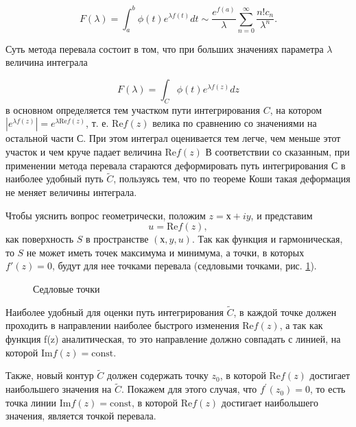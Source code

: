 \documentclass[%
bachelor,    %
natbib,      %
subf,        %
href,        %
colorlinks,  %
]{disser}
\renewcommand{\Re}{\mathrm{Re}}
\renewcommand{\Im}{\mathrm{Im}}
\newcommand{\const}{\mathrm{const}}
\begin{document}
\begin{equation}\label{eq:eq10}
F(\lambda) = \int_{a}^{b}\phi(t)e^{\lambda f(t)}dt \sim \frac{e^{f(a)}}{\lambda}\sum_{n=0}^{\infty}\frac{n! c_n}{\lambda^n}.
\end{equation}

Суть метода перевала состоит в том, что при больших значениях параметра $\lambda$ величина интеграла

$$
F(\lambda) = \int_{C}^{}\phi(t)e^{\lambda f(z)}dz
$$
в основном определяется тем участком пути интегрирования $C$, на котором $|e^{\lambda f(z)}|=e^{\lambda \Re f(z)}$, т. е. $\Re f(z)$ велика по сравнению со значениями на остальной части $С$. При этом интеграл оценивается тем легче, чем меньше этот участок и чем круче падает величина $\Re f(z)$ В соответствии со сказанным, при применении метода перевала стараются деформировать путь интегрирования С в наиболее удобный путь $\widetilde{C}$, пользуясь тем, что по теореме Коши такая деформация не меняет величины интеграла.\cite{Urmat}

Чтобы уяснить вопрос геометрически, положим $z = х + iy$, и представим
$$
u = \Re f(z),
$$
как поверхность $S$ в пространстве $(х, y, u)$. Так как функция и гармоническая, то $S$ не может иметь точек максимума и минимума, а точки, в которых $f'(z) = 0$, будут для нее точками перевала (седловыми точками, рис. \ref{ris:image2}).

\begin{figure}[h]
	\caption{Седловые точки}
	\label{ris:image2}
	\end{figure}
	
	Наиболее удобный для оценки путь интегрирования $\widetilde{C}$, в каждой точке должен проходить в направлении наиболее быстрого изменения $\Re f(z)$, а так как функция f(z) аналитическая, то это направление должно совпадать с линией, на которой $\Im f(z) = \const$. 
	
	Также, новый контур $\widetilde{C}$ должен содержать точку $z_0$, в которой $\Re f(z)$ достигает наибольшего значения на $\widetilde{C}$. Покажем для этого случая, что $f^\prime (z_0) = 0$, то есть точка линии $\Im f(z) = \const$, в которой $\Re f (z)$ достигает наибольшего значения, является точкой перевала.
	
\end{document}
